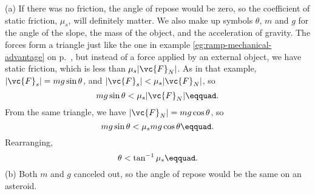 (a) If there was no friction, the angle of repose would
be zero, so the coefficient of static friction, $\mu_s$,
will definitely matter. We also make up symbols $\theta$, $m$
and $g$ for the angle of the slope, the mass of the object,
and the acceleration of gravity. The forces form a triangle
just like the one in example \ref{eg:ramp-mechanical-advantage}
on p.~\pageref{eg:ramp-mechanical-advantage}, but instead of a force
applied by an external object, we have static friction,
which is less than $\mu_s |\vc{F}_N|$. As in that example,
$|\vc{F}_s|=mg \sin \theta$, and $|\vc{F}_s|<\mu_s |\vc{F}_N|$, so
\begin{equation*}
    mg \sin  \theta<\mu_s |\vc{F}_N|\eqquad.
\end{equation*}
From the same triangle, we have $|\vc{F}_N|=mg \cos\theta $, so
\begin{equation*}
    mg \sin  \theta<\mu_s mg \cos \theta\eqquad.
\end{equation*}
Rearranging,
\begin{equation*}
    \theta  < \tan^{-1} \mu_s\eqquad.
\end{equation*}
(b) Both $m$ and $g$ canceled out, so the angle of repose
would be the same on an asteroid.
